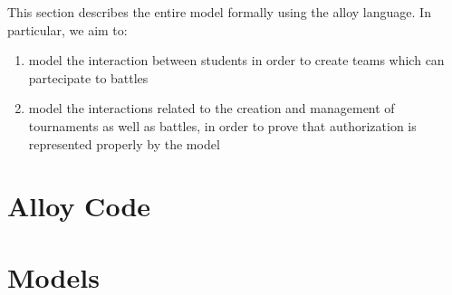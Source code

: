 This section describes the entire model formally using the alloy language.
In particular, we aim to:
\begin{enumerate}
      \item model the interaction between students
            in order to create teams which can partecipate to battles
      \item model the interactions related to the creation and management
            of tournaments as well as battles, in order to prove that
            authorization is represented properly by the model
\end{enumerate}

\section{Alloy Code}


\pagebreak
\section{Models}


